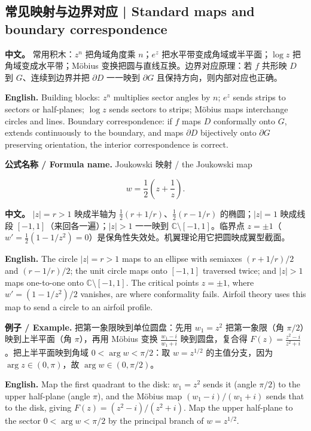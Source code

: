\documentclass[UTF8,11pt,a4paper]{ctexart}
\newcommand{\EN}[1]{\par\noindent \textbf{English.} #1\par}
\newcommand{\FORMULA}[2]{\par\noindent\textbf{公式名称 / Formula name.} #1 / #2\par}
\newcommand{\EX}[2]{\par\noindent \textbf{例子 / Example.} #1\par\EN{#2}}
\newcommand{\APS}[2]{\par\noindent\textbf{中文。} #1\par\noindent\textbf{English.} #2\par\smallskip}
\begin{document}
\subsection{常见映射与边界对应 | Standard maps and boundary correspondence}
\APS{常用积木：$z^n$ 把角域角度乘 $n$；$e^z$ 把水平带变成角域或半平面；$\log z$ 把角域变成水平带；Möbius 变换把圆与直线互换。边界对应原理：若 $f$ 共形映 $D$ 到 $G$、连续到边界并把 $\partial D$ 一一映到 $\partial G$ 且保持方向，则内部对应也正确。}{Building blocks: $z^n$ multiplies sector angles by $n$; $e^z$ sends strips to sectors or half-planes; $\log z$ sends sectors to strips; Möbius maps interchange circles and lines. Boundary correspondence: if $f$ maps $D$ conformally onto $G$, extends continuously to the boundary, and maps $\partial D$ bijectively onto $\partial G$ preserving orientation, the interior correspondence is correct.}
\FORMULA{Joukowski 映射}{the Joukowski map}
\[
w=\frac12\left(z+\frac1z\right).
\]
\APS{$|z|=r>1$ 映成半轴为 $\frac12(r+1/r)$、$\frac12(r-1/r)$ 的椭圆；$|z|=1$ 映成线段 $[-1,1]$（来回各一遍）；$|z|>1$ 一一映到 $\mathbb C\setminus[-1,1]$。临界点 $z=\pm1$（$w'=\frac12(1-1/z^2)=0$）是保角性失效处。机翼理论用它把圆映成翼型截面。}{The circle $|z|=r>1$ maps to an ellipse with semiaxes $(r+1/r)/2$ and $(r-1/r)/2$; the unit circle maps onto $[-1,1]$ traversed twice; and $|z|>1$ maps one-to-one onto $\mathbb C\setminus[-1,1]$. The critical points $z=\pm1$, where $w'=(1-1/z^2)/2$ vanishes, are where conformality fails. Airfoil theory uses this map to send a circle to an airfoil profile.}
\EX{把第一象限映到单位圆盘：先用 $w_1=z^2$ 把第一象限（角 $\pi/2$）映到上半平面（角 $\pi$），再用 Möbius 变换 $\frac{w_1-i}{w_1+i}$ 映到圆盘，复合得 $F(z)=\frac{z^2-i}{z^2+i}$。把上半平面映到角域 $0<\arg w<\pi/2$：取 $w=z^{1/2}$ 的主值分支，因为 $\arg z\in(0,\pi)$，故 $\arg w\in(0,\pi/2)$。}{Map the first quadrant to the disk: $w_1=z^2$ sends it (angle $\pi/2$) to the upper half-plane (angle $\pi$), and the Möbius map $(w_1-i)/(w_1+i)$ sends that to the disk, giving $F(z)=(z^2-i)/(z^2+i)$. Map the upper half-plane to the sector $0<\arg w<\pi/2$ by the principal branch of $w=z^{1/2}$.}
\end{document}
